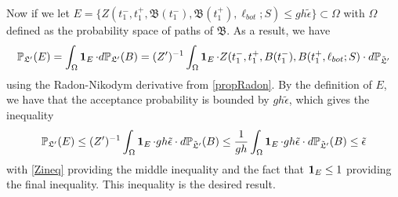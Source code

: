 	Now if we let $E=\{Z(t_1^-,t_1^+,\mathfrak{B}(t_1^-),\mathfrak{B}(t_1^+),\ell_{bot};S)\leq gh\tilde\epsilon\}\subset \Omega$ with $\Omega$ defined as the probability space of paths of $\mathfrak B$. As a result, we have 
	\[
	\mathbb{P}_{\mathfrak L'}(E)=\int_\Omega \operatorname{\mathbf{1}}_E\cdot d\mathbb{P}_{\mathfrak L'}(B)=(Z')^{-1}\int_\Omega\operatorname{\mathbf{1}}_E\cdot Z(t_1^-,t_1^+,B(t_1^-),B(t_1^+,\ell_{bot};S)\cdot d\mathbb{P}_{\tilde{\mathfrak{L}}'}
	\]
	using the Radon-Nikodym derivative from \ref{propRadon}. By the definition of $E$, we have that the acceptance probability is bounded by $gh\tilde{\epsilon}$, which gives the inequality \[\mathbb{P}_{\mathfrak L'}(E)\leq (Z')^{-1}\int_\Omega \operatorname{\mathbf{1}}_E\cdot gh\tilde{\epsilon}\cdot d\mathbb{P}_{\tilde{\mathfrak{L}}'}(B)\leq \frac{1}{gh}\int_\Omega\operatorname{\mathbf{1}}_E\cdot gh\tilde\epsilon\cdot d\mathbb{P}_{\tilde{\mathfrak{L}}'}(B)\leq \tilde{\epsilon}\] with \ref{Zineq}  providing the middle inequality and the fact that $\operatorname{\mathbf{1}}_E\leq 1$ providing the final inequality. This inequality is the desired result.












